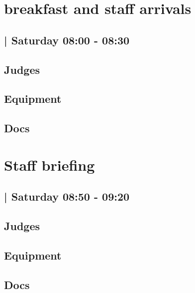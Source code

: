 \documentclass[10pt]{article}
\begin{document}
		\begin{minipage}{\linewidth}
		\setcounter{section}{12}
	\section{breakfast and staff arrivals }
	\subsection*{ | Saturday 08:00 - 08:30}

	

	\begin{multicols}{2}
	\subsection*{\faUsers \: Judges}
	\begin{itemize}
		\end{itemize}
	\columnbreak
	\subsection*{\faWrench \: Equipment}
	        \vfill\null
        \subsection*{\faFile \: Docs}
     	\end{multicols}


	\vspace{1cm}
	\end{minipage}

		\begin{minipage}{\linewidth}
		\setcounter{section}{13}
	\section{Staff briefing }
	\subsection*{ | Saturday 08:50 - 09:20}

	

	\begin{multicols}{2}
	\subsection*{\faUsers \: Judges}
	\begin{itemize}
		\end{itemize}
	\columnbreak
	\subsection*{\faWrench \: Equipment}
	        \vfill\null
        \subsection*{\faFile \: Docs}
     	\end{multicols}


	\vspace{1cm}
	\end{minipage}
\end{document}
